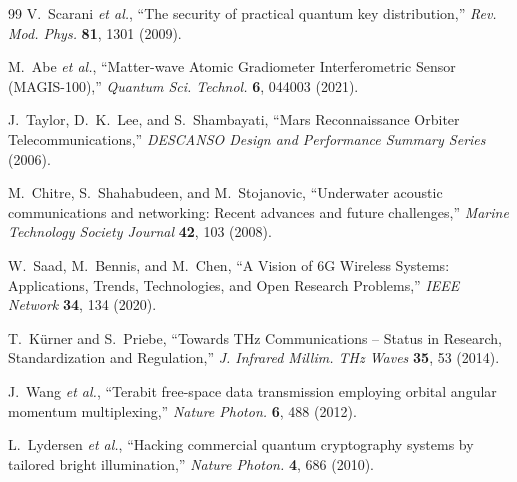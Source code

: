\documentclass[twocolumn,superscriptaddress,prd,nofootinbib]{revtex4-2}
\begin{document}
\begin{thebibliography}{99}
V.~Scarani \textit{et al.},
``The security of practical quantum key distribution,''
\textit{Rev. Mod. Phys.} \textbf{81}, 1301 (2009).

M.~Abe \textit{et al.},
``Matter-wave Atomic Gradiometer Interferometric Sensor (MAGIS-100),''
\textit{Quantum Sci. Technol.} \textbf{6}, 044003 (2021).

J.~Taylor, D.~K.~Lee, and S.~Shambayati,
``Mars Reconnaissance Orbiter Telecommunications,''
\textit{DESCANSO Design and Performance Summary Series} (2006).

M.~Chitre, S.~Shahabudeen, and M.~Stojanovic,
``Underwater acoustic communications and networking: Recent advances and future challenges,''
\textit{Marine Technology Society Journal} \textbf{42}, 103 (2008).

W.~Saad, M.~Bennis, and M.~Chen,
``A Vision of 6G Wireless Systems: Applications, Trends, Technologies, and Open Research Problems,''
\textit{IEEE Network} \textbf{34}, 134 (2020).

T.~K\"urner and S.~Priebe,
``Towards THz Communications -- Status in Research, Standardization and Regulation,''
\textit{J. Infrared Millim. THz Waves} \textbf{35}, 53 (2014).

J.~Wang \textit{et al.},
``Terabit free-space data transmission employing orbital angular momentum multiplexing,''
\textit{Nature Photon.} \textbf{6}, 488 (2012).

L.~Lydersen \textit{et al.},
``Hacking commercial quantum cryptography systems by tailored bright illumination,''
\textit{Nature Photon.} \textbf{4}, 686 (2010).

\end{thebibliography}
\end{document}
